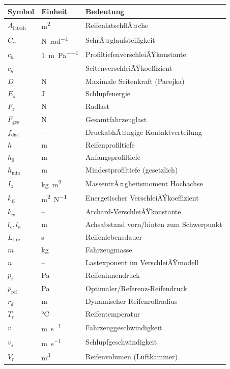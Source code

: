 ﻿\documentclass[12pt,a4paper]{article}
\theoremstyle{definition}
\theoremstyle{remark}
\newcommand{\Fz}{F_z}
\begin{document}
\begin{longtable}{lll}
\toprule
\textbf{Symbol} & \textbf{Einheit} & \textbf{Bedeutung}\\
\midrule
$A_{\mathrm{latsch}}$ & \si{\metre\squared} & ReifenlatschflÃ¤che\\
$C_\alpha$ & \si{\newton\per\radian} & SchrÃ¤glaufsteifigkeit\\
$c_h$ & \si{1\per\metre\per\pascal} & ProfiltiefenverschleiÃŸkonstante\\
$c_y$ & -- & SeitenverschleiÃŸkoeffizient\\
$D$ & \si{\newton} & Maximale Seitenkraft (Pacejka)\\
$E_s$ & \si{\joule} & Schlupfenergie\\
$\Fz$ & \si{\newton} & Radlast\\
$F_{\mathrm{ges}}$ & \si{\newton} & Gesamtfahrzeuglast\\
$f_{\mathrm{dist}}$ & -- & DruckabhÃ¤ngige Kontaktverteilung\\
$h$ & \si{\metre} & Reifenprofiltiefe\\
$h_0$ & \si{\metre} & Anfangsprofiltiefe\\
$h_{\min}$ & \si{\metre} & Mindestprofiltiefe (gesetzlich)\\
$I_z$ & \si{\kilogram\metre\squared} & MassentrÃ¤gheitsmoment Hochachse\\
$k_E$ & \si{\metre\squared\per\newton} & Energetischer VerschleiÃŸkoeffizient\\
$k_w$ & -- & Archard-VerschleiÃŸkonstante\\
$l_v, l_h$ & \si{\metre} & Achsabstand vorn/hinten zum Schwerpunkt\\
$L_{\mathrm{tire}}$ & \si{\second} & Reifenlebensdauer\\
$m$ & \si{\kilogram} & Fahrzeugmasse\\
$n$ & -- & Lastexponent im VerschleiÃŸmodell\\
$p_i$ & \si{\pascal} & Reifeninnendruck\\
$p_{\mathrm{ref}}$ & \si{\pascal} & Optimaler/Referenz-Reifendruck\\
$r_d$ & \si{\metre} & Dynamischer Reifenrollradius\\
$T_r$ & \si{\celsius} & Reifentemperatur\\
$v$ & \si{\metre\per\second} & Fahrzeuggeschwindigkeit\\
$v_s$ & \si{\metre\per\second} & Schlupfgeschwindigkeit\\
$V_r$ & \si{\metre\cubed} & Reifenvolumen (Luftkammer)\\

\end{longtable}
\end{document}

